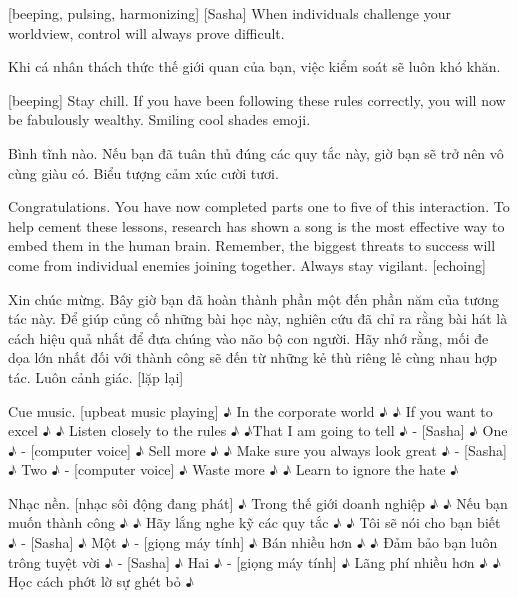 \documentclass[a4paper]{article}
\begin{document}
	
	[beeping, pulsing, harmonizing]
	[Sasha] When individuals challenge your worldview, control will always prove difficult.
	
	\begin{vietnamese-v2}
		 Khi cá nhân thách thức thế giới quan của bạn, việc kiểm soát sẽ luôn khó khăn.
	\end{vietnamese-v2}
	
	[beeping]
	Stay chill.
	If you have been following these rules correctly, you will now be fabulously wealthy.
	Smiling cool shades emoji.
	
	\begin{vietnamese-v2}
		[bíp]
		Bình tĩnh nào.
		Nếu bạn đã tuân thủ đúng các quy tắc này, giờ bạn sẽ trở nên vô cùng giàu có.
		Biểu tượng cảm xúc cười tươi.
	\end{vietnamese-v2}
	
	Congratulations.
	You have now completed parts one to five of this interaction.
	To help cement these lessons, research has shown a song is the most effective way to embed them in the human brain.
	Remember, the biggest threats to success will come from individual enemies joining together.
	Always stay vigilant. [echoing]
	
	\begin{vietnamese-v2}
		Xin chúc mừng.
		Bây giờ bạn đã hoàn thành phần một đến phần năm của tương tác này.
		Để giúp củng cố những bài học này, nghiên cứu đã chỉ ra rằng bài hát là cách hiệu quả nhất để đưa chúng vào não bộ con người.
		Hãy nhớ rằng, mối đe dọa lớn nhất đối với thành công sẽ đến từ những kẻ thù riêng lẻ cùng nhau hợp tác.
		Luôn cảnh giác. [lặp lại]
	\end{vietnamese-v2}
	
	Cue music.
	[upbeat music playing]
	♪ In the corporate world ♪
	♪ If you want to excel ♪
	♪ Listen closely to the rules ♪
	♪That I am going to tell ♪
	- [Sasha] ♪ One ♪ - [computer voice] ♪ Sell more ♪
	♪ Make sure you always look great ♪
	- [Sasha] ♪ Two ♪ - [computer voice] ♪ Waste more ♪
	♪ Learn to ignore the hate ♪
	
	\begin{vietnamese-v2}
		Nhạc nền.
		[nhạc sôi động đang phát]
		♪ Trong thế giới doanh nghiệp ♪
		♪ Nếu bạn muốn thành công ♪
		♪ Hãy lắng nghe kỹ các quy tắc ♪
		♪ Tôi sẽ nói cho bạn biết ♪
		- [Sasha] ♪ Một ♪ - [giọng máy tính] ♪ Bán nhiều hơn ♪
		♪ Đảm bảo bạn luôn trông tuyệt vời ♪
		- [Sasha] ♪ Hai ♪ - [giọng máy tính] ♪ Lãng phí nhiều hơn ♪
		♪ Học cách phớt lờ sự ghét bỏ ♪
	\end{vietnamese-v2}
	
\end{document}
